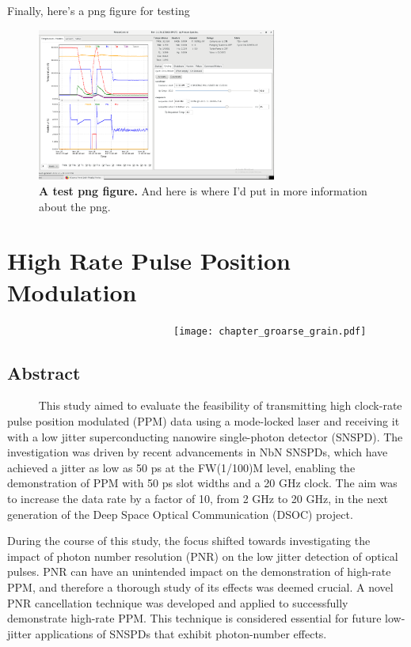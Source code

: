 \documentclass[12pt]{caltech_thesis}
\begin{document}
Finally, here's a png figure for testing

\hypertarget{fig:test_png_figure}{%
\begin{figure}
\centering
\includegraphics[width=0.7\textwidth,height=\textheight]{chapter_01/figs_01/fridge.png}
\caption[{A png figure.}]{\textbf{A test png figure.} And here is where
I'd put in more information about the png.}
\label{fig:test_png_figure}
\end{figure}
}

\hypertarget{high-rate-pulse-position-modulation}{%
\chapter{High Rate Pulse Position
Modulation}\label{high-rate-pulse-position-modulation}}

~~~~~~~~~~~~~~~~~~~~~~~~~~~~~~\texttt{[image: chapter\_groarse\_grain.pdf]}

\hypertarget{abstract-1}{%
\section{Abstract}\label{abstract-1}}

~~~~~ This study aimed to evaluate the feasibility of transmitting high
clock-rate pulse position modulated (PPM) data using a mode-locked laser
and receiving it with a low jitter superconducting nanowire
single-photon detector (SNSPD). The investigation was driven by recent
advancements in NbN SNSPDs, which have achieved a jitter as low as 50 ps
at the FW(1/100)M level, enabling the demonstration of PPM with 50 ps
slot widths and a 20 GHz clock. The aim was to increase the data rate by
a factor of 10, from 2 GHz to 20 GHz, in the next generation of the Deep
Space Optical Communication (DSOC) project.

During the course of this study, the focus shifted towards investigating
the impact of photon number resolution (PNR) on the low jitter detection
of optical pulses. PNR can have an unintended impact on the
demonstration of high-rate PPM, and therefore a thorough study of its
effects was deemed crucial. A novel PNR cancellation technique was
developed and applied to successfully demonstrate high-rate PPM. This
technique is considered essential for future low-jitter applications of
SNSPDs that exhibit photon-number effects.
\end{document}
